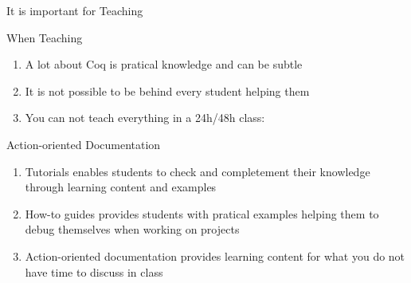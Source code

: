 \documentclass[10pt]{beamer}
\begin{document}
\begin{frame}{It is important for Teaching}
  \begin{tcbProp}{When Teaching}
    \begin{enumerate}
      \item<1-> A lot about Coq is pratical knowledge and can be subtle
      \item<2-> It is not possible to be behind every student helping them
      \item<3-> You can not teach everything in a 24h/48h class:
    \end{enumerate}
  \end{tcbProp}
  \begin{tcbSol}{Action-oriented Documentation}
    \begin{enumerate}
      \item<5-> Tutorials enables students to check and completement their knowledge
            through learning content and examples
      \item<6-> How-to guides provides students with pratical examples helping them
            to debug themselves when working on projects
      \item<7-> Action-oriented documentation provides learning content for what you
                do not have time to discuss in class
    \end{enumerate}
  \end{tcbSol}
\end{frame}
\end{document}
